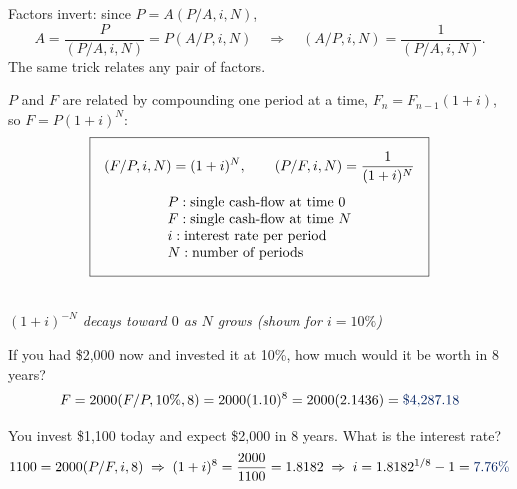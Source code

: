 \begin{remark}
    Factors invert: since $P = A(P/A,i,N)$,
    \[A = \frac{P}{(P/A,i,N)} = P(A/P,i,N) \quad\Rightarrow\quad (A/P,i,N) = \frac{1}{(P/A,i,N)}.\]
    The same trick relates any pair of factors.
\end{remark}

\begin{definition}
    $P$ and $F$ are related by compounding one period at a time,
    $F_n = F_{n-1}(1+i)$, so $F = P(1+i)^N$:
    \[\boxed{\begin{gathered}
        (F/P,i,N) = (1+i)^N, \qquad (P/F,i,N) = \frac{1}{(1+i)^N}\\[4pt]
        \begin{array}{@{}l@{}}
            P: \text{single cash-flow at time } 0\\
            F: \text{single cash-flow at time } N\\
            i: \text{interest rate per period}\\
            N: \text{number of periods}
        \end{array}
    \end{gathered}}\]
\end{definition}

\begin{center}
    \\[2pt] \textit{\small $(1+i)^{-N}$ decays toward $0$ as $N$ grows (shown for $i=10\%$)}
\end{center}

\begin{example}[F/P]
    If you had \$2,000 now and invested it at 10\%, how much would it be worth in 8 years?
    \[F = 2000(F/P,10\%,8) = 2000(1.10)^8 = 2000(2.1436) = \db{\$4{,}287.18}\]
\end{example}

\begin{example}
    You invest \$1,100 today and expect \$2,000 in 8 years. What is the interest rate?
    \[1100 = 2000(P/F,i,8) \;\Rightarrow\; (1+i)^8 = \frac{2000}{1100} = 1.8182 \;\Rightarrow\; i = 1.8182^{1/8} - 1 = \db{7.76\%}\]
\end{example}

